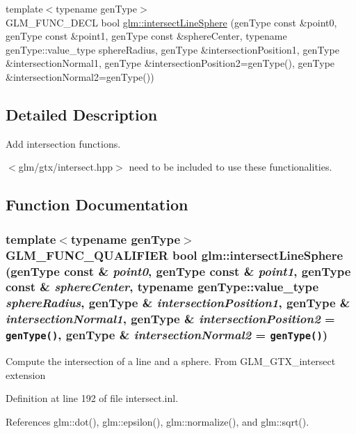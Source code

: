 \begin{CompactItemize}
\item 
{\footnotesize template$<$typename genType$>$ }\\GLM\_\-FUNC\_\-DECL bool \hyperlink{group__gtx__intersect_g28b9b80acf2ea35780709e01b27ab60f}{glm::intersectLineSphere} (genType const \&point0, genType const \&point1, genType const \&sphereCenter, typename genType::value\_\-type sphereRadius, genType \&intersectionPosition1, genType \&intersectionNormal1, genType \&intersectionPosition2=genType(), genType \&intersectionNormal2=genType())
\end{CompactItemize}


\subsection{Detailed Description}
Add intersection functions. 

$<$glm/gtx/intersect.hpp$>$ need to be included to use these functionalities. 

\subsection{Function Documentation}
\hypertarget{group__gtx__intersect_g28b9b80acf2ea35780709e01b27ab60f}{
\subsubsection[intersectLineSphere]{\setlength{\rightskip}{0pt plus 5cm}template$<$typename genType$>$ GLM\_\-FUNC\_\-QUALIFIER bool glm::intersectLineSphere (genType const \& {\em point0}, \/  genType const \& {\em point1}, \/  genType const \& {\em sphereCenter}, \/  typename genType::value\_\-type {\em sphereRadius}, \/  genType \& {\em intersectionPosition1}, \/  genType \& {\em intersectionNormal1}, \/  genType \& {\em intersectionPosition2} = {\tt genType()}, \/  genType \& {\em intersectionNormal2} = {\tt genType()})}}
\label{group__gtx__intersect_g28b9b80acf2ea35780709e01b27ab60f}


Compute the intersection of a line and a sphere. From GLM\_\-GTX\_\-intersect extension 

Definition at line 192 of file intersect.inl.

References glm::dot(), glm::epsilon(), glm::normalize(), and glm::sqrt().

